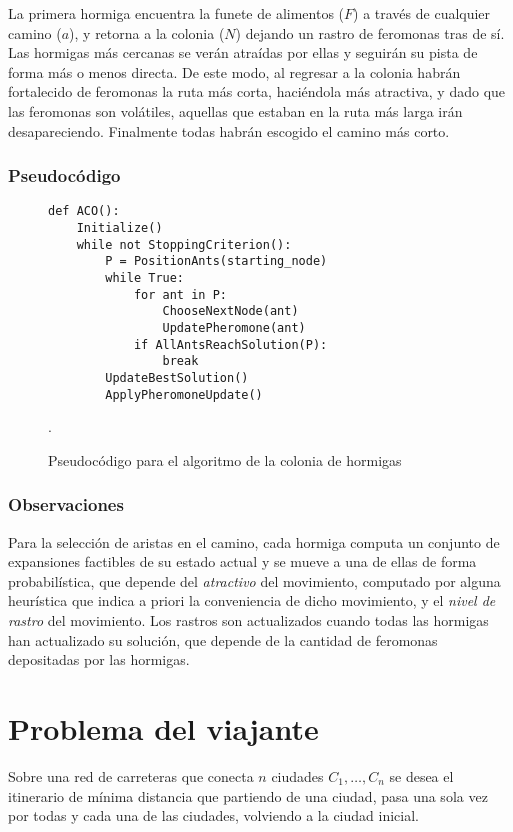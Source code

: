 \documentclass[titlepage, 11pt]{scrartcl}
\begin{document}
			La primera hormiga encuentra la funete de alimentos ($F$) a través de cualquier camino ($a$), y retorna a la colonia ($N$) dejando un rastro de feromonas tras de sí. Las hormigas más cercanas se verán atraídas por ellas y seguirán su pista de forma más o menos directa. De este modo, al regresar a la colonia habrán fortalecido de feromonas la ruta más corta, haciéndola más atractiva, y dado que las feromonas son volátiles, aquellas que estaban en la ruta más larga irán desapareciendo. Finalmente todas habrán escogido el camino más corto.
			
			\subsubsection{Pseudocódigo}
				\begin{figure}[H]
					\begin{verbatim}
def ACO():
	Initialize()
	while not StoppingCriterion():
		P = PositionAnts(starting_node)
		while True:
			for ant in P:
				ChooseNextNode(ant)
				UpdatePheromone(ant)
			if AllAntsReachSolution(P):
				break
		UpdateBestSolution()
		ApplyPheromoneUpdate()		
	    			\end{verbatim}
	    			\caption{Pseudocódigo para el algoritmo de la colonia de hormigas}.
    			\end{figure}
    		
    		\subsubsection{Observaciones}
    			Para la selección de aristas en el camino, cada hormiga computa un conjunto de expansiones factibles de su estado actual y se mueve a una de ellas de forma probabilística, que depende del \textit{atractivo} del movimiento, computado por alguna heurística que indica a priori la conveniencia de dicho movimiento, y el \textit{nivel de rastro} del movimiento. Los rastros son actualizados cuando todas las hormigas han actualizado su solución, que depende de la cantidad de feromonas depositadas por las hormigas.
		    
 	\section{Problema del viajante}
 	
 		Sobre una red de carreteras que conecta $n$ ciudades $C_1, \ldots, C_n$ se desea el itinerario de mínima distancia que partiendo de una ciudad, pasa una sola vez por todas y cada una de las ciudades, volviendo a la ciudad inicial.
 		
\end{document}
